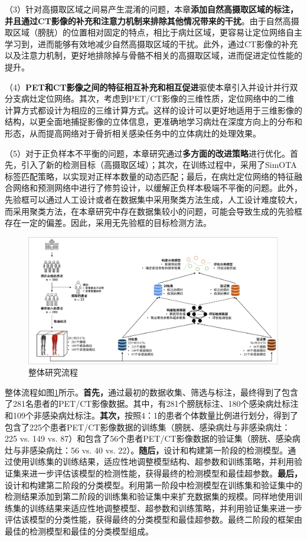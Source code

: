（3）针对高摄取区域之间易产生混淆的问题，本章\textbf{添加自然高摄取区域的标注，并且通过CT影像的补充和注意力机制来排除其他情况带来的干扰}。由于自然高摄取区域（膀胱）的位置相对固定的特点，相比于病灶区域，更容易让定位网络自主学习到，进而能够有效地减少自然高摄取区域的干扰。此外，通过CT影像的补充以及注意力机制，更好地排除掉与骨骼不相关的高摄取区域，进而促进定位性能的提升。

（4）\textbf{PET和CT影像之间的特征相互补充和相互促进}驱使本章引入并设计并行双分支病灶定位网络。其次，考虑到PET/CT影像的三维性质，定位网络中的二维计算方式都设计为相应的三维计算方式。这样的设计可以更好地适用于三维影像的结构，以更全面地捕捉影像的立体信息，更准确地学习病灶在深度方向上的分布和形态，从而提高网络对于骨折相关感染任务中的立体病灶的处理效果。

（5）对于正负样本不平衡的问题，本章研究通过\textbf{多方面的改进策略}进行优化。首先，引入了新的检测目标（高摄取区域）；其次，在训练过程中，采用了SimOTA标签匹配策略，以实现对正样本数量的动态匹配；最后，在病灶定位网络的特征融合网络和预测网络中进行了修剪设计，以缓解正负样本极端不平衡的问题。此外，先验框可以通过人工设计或者在数据集中采用聚类方法生成，人工设计难度较大，而采用聚类方法，在本章研究中存在数据集较小的问题，可能会导致生成的先验框存在一定的偏差。因此，采用无先验框的目标检测方法。

\begin{figure}[htbp]
  \centering
  \includegraphics[width=\textwidth]{figures/chap04_study.jpg}
  \caption{整体研究流程}
  \label{fig:chap04_study}
\end{figure}

整体流程如图\ref{fig:chap04_study}所示。\textbf{首先，}通过最初的数据收集、筛选与标注，最终得到了包含了281名患者的PET/CT影像数据。其中，有281个膀胱标注、180个感染病灶标注和109个非感染病灶标注。\textbf{其次，}按照4：1的患者个体数量比例进行划分，得到了包含了225个患者PET/CT影像数据的训练集（膀胱、感染病灶与非感染病灶：225 vs. 149 vs. 87）和包含了56个患者PET/CT影像数据的验证集（膀胱、感染病灶与非感染病灶：56 vs. 40 vs. 22）。\textbf{随后，}设计和构建第一阶段的检测模型。通过使用训练集的训练结果，适应性地调整模型结构、超参数和训练策略，并利用验证集来进一步评估该模型的检测性能，获得最终的检测模型和最佳超参数。\textbf{最后，}设计和构建第二阶段的分类模型。利用第一阶段中检测模型在训练集和验证集中的检测结果添加到第二阶段的训练集和验证集中来扩充数据集的规模。同样地使用训练集的训练结果来适应性地调整模型、超参数和训练策略，并利用验证集来进一步评估该模型的分类性能，获得最终的分类模型和最佳超参数。最终二阶段的框架由最佳的检测模型和最佳的分类模型组成。

